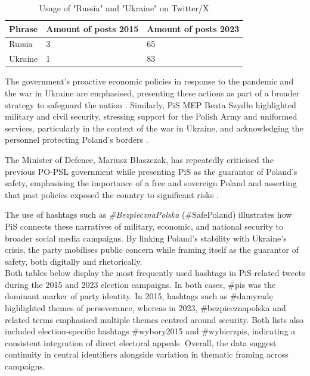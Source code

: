 \begin{table}[H]
    \centering
    \begin{tabular}{p{4cm}p{4cm}p{4cm}}
        \toprule
        \textbf{Phrase} & \textbf{Amount of posts 2015}  & \textbf{Amount of posts 2023} \\ \midrule
        Russia & 3 & 65  \\
        Ukraine & 1 & 83  \\ \bottomrule
    \end{tabular}
    \caption{Usage of "Russia" and "Ukraine" on Twitter/X \citep{rybicki_2025_16933320}}
    \label{tab:phrases-comp-2-2015-2023}
\end{table}

The government's proactive economic policies in response to the pandemic and the war in Ukraine are emphasised, presenting these actions as part of a broader strategy to safeguard the nation \citep{pisorgpl2023g}. Similarly, PiS MEP Beata Szydło highlighted military and civil security, stressing support for the Polish Army and uniformed services, particularly in the context of the war in Ukraine, and acknowledging the personnel protecting Poland's borders \citep{pisorgpl2023h}.

The Minister of Defence, Mariusz Błaszczak, has repeatedly criticised the previous PO-PSL government while presenting PiS as the guarantor of Poland's safety, emphasising the importance of a free and sovereign Poland and asserting that past policies exposed the country to significant risks \citep{pisorgpl2023i}.

The use of hashtags such as \textit{\#BezpiecznaPolska} (\#SafePoland) illustrates how PiS connects these narratives of military, economic, and national security to broader social media campaigns. By linking Poland's stability with Ukraine's crisis, the party mobilises public concern while framing itself as the guarantor of safety, both digitally and rhetorically. \\

Both tables below display the most frequently used hashtags in PiS-related tweets during the 2015 and 2023 election campaigns. In both cases, \#pis was the dominant marker of party identity. In 2015, hashtags such as \#damyradę highlighted themes of perseverance, whereas in 2023, \#bezpiecznapolska and related terms emphasised multiple themes centred around security. Both lists also included election-specific hashtags \#wybory2015 and \#wybierzpis, indicating a consistent integration of direct electoral appeals. Overall, the data suggest continuity in central identifiers alongside variation in thematic framing across campaigns.

